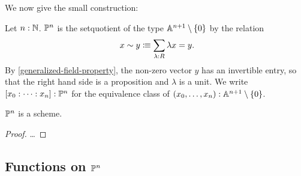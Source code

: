 We now give the small construction:

\begin{definition}%
  \label{projective-space-hit}
  Let $n:\mathbb{N}$.
   $\mathbb{P}^n$ is the setquotient of the type $\mathbb{A}^{n+1}\setminus\{0\}$ by the relation
  \[
    x \sim y \colonequiv \sum_{\lambda : R} \lambda x=y\rlap{.}
  \]
  By \cref{generalized-field-property}, the non-zero vector $y$ has an invertible entry,
  so that the right hand side is a proposition and $\lambda$ is a unit.
  We write $[x_0:\dots:x_n]:\mathbb{P}^n$ for the equivalence class of $(x_0,\dots,x_n):\mathbb{A}^{n+1}\setminus\{0\}$.
\end{definition}

\begin{theorem}
  $\mathbb{P}^n$ is a scheme.
\end{theorem}

\begin{proof}
  \dots
\end{proof}

\subsection{Functions on $\mathbb{P}^n$}

